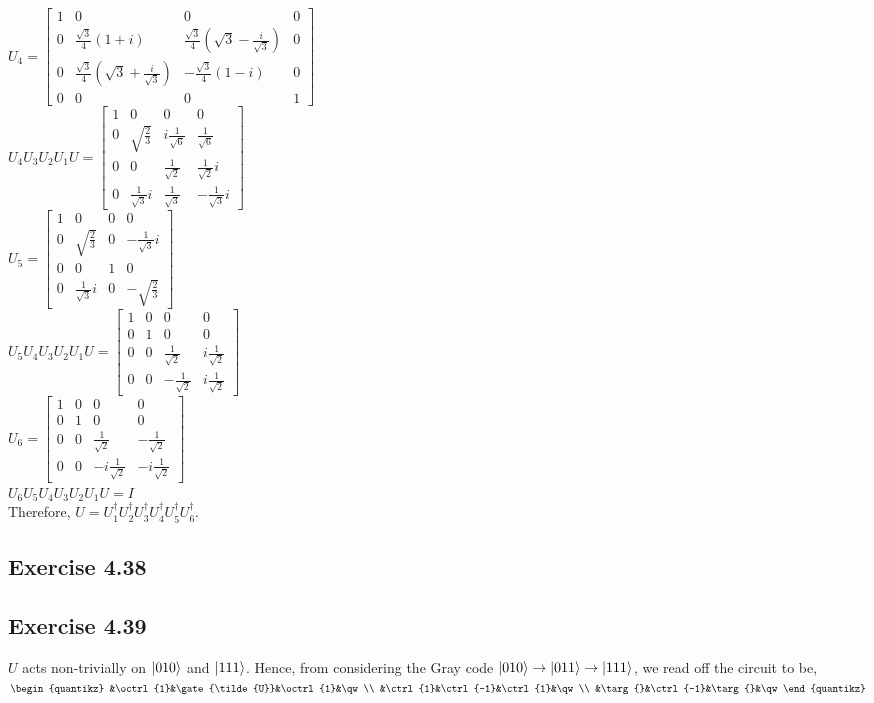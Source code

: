 \documentclass[a4paper,12pt]{article}
\begin{document}
$U_4=\begin{bmatrix}
    1&0&0&0\\
    0&\frac{\sqrt{3}}{4}(1+i)&\frac{\sqrt{3}}{4}(\sqrt{3}-\frac{i}{\sqrt{3}})&0\\
    0&\frac{\sqrt{3}}{4}(\sqrt{3}+\frac{i}{\sqrt{3}})&-\frac{\sqrt{3}}{4}(1-i)&0\\
    0&0&0&1
\end{bmatrix}$\\
$U_4U_3U_2U_1U=\begin{bmatrix}
    1&0&0&0\\
    0&\sqrt{\frac{2}{3}}&i\frac{1}{\sqrt{6}}&\frac{1}{\sqrt{6}}\\
    0&0&\frac{1}{\sqrt{2}}&\frac{1}{\sqrt{2}}i\\
    0&\frac{1}{\sqrt{3}}i&\frac{1}{\sqrt{3}}&-\frac{1}{\sqrt{3}}i
\end{bmatrix}$\\
$U_5=\begin{bmatrix}
    1&0&0&0\\
    0&\sqrt{\frac{2}{3}}&0&-\frac{1}{\sqrt{3}}i\\
    0&0&1&0\\
    0&\frac{1}{\sqrt{3}}i&0&-\sqrt{\frac{2}{3}}
\end{bmatrix}$\\
$U_5U_4U_3U_2U_1U=\begin{bmatrix}
    1&0&0&0\\
    0&1&0&0\\
    0&0&\frac{1}{\sqrt{2}}&i\frac{1}{\sqrt{2}}\\
    0&0&-\frac{1}{\sqrt{2}}&i\frac{1}{\sqrt{2}}
\end{bmatrix}$\\
$U_6=\begin{bmatrix}
    1&0&0&0\\
    0&1&0&0\\
    0&0&\frac{1}{\sqrt{2}}&-\frac{1}{\sqrt{2}}\\
    0&0&-i\frac{1}{\sqrt{2}}&-i\frac{1}{\sqrt{2}}
\end{bmatrix}$\\
$U_6U_5U_4U_3U_2U_1U=I$\\
Therefore, $U=U_1^\dagger U_2^\dagger U_3^\dagger 
U_4^\dagger U_5^\dagger U_6^\dagger$.
\subsection*{Exercise 4.38}

\subsection*{Exercise 4.39}
$U$ acts non-trivially on $\ket{010}$ and $\ket{111}$.
Hence, from considering the Gray code $\ket{010}\rightarrow
\ket{011}\rightarrow\ket{111}$, we read off the circuit to be,\\
$\begin{quantikz}
    &\octrl{1}&\gate{\tilde{U}}&\octrl{1}&\qw\\
    &\ctrl{1}&\ctrl{-1}&\ctrl{1}&\qw\\
    &\targ{}&\ctrl{-1}&\targ{}&\qw
\end{quantikz}$
\end{document}
